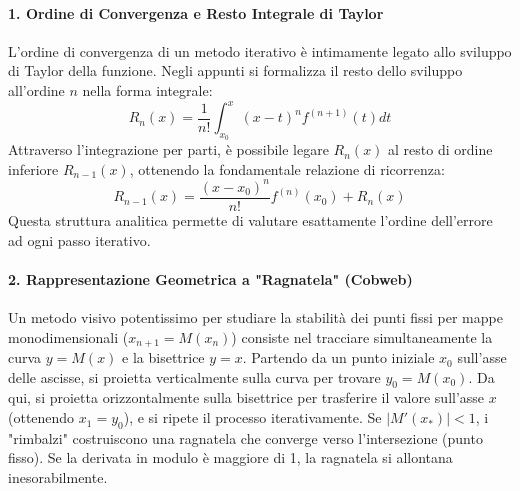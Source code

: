 \documentclass[12pt,a4paper]{article}
\begin{document}
\paragraph{1. Ordine di Convergenza e Resto Integrale di Taylor}
L'ordine di convergenza di un metodo iterativo è intimamente legato allo sviluppo di Taylor della funzione. Negli appunti si formalizza il resto dello sviluppo all'ordine $n$ nella forma integrale:
\begin{equation}
R_n(x) = \frac{1}{n!} \int_{x_0}^x (x-t)^n f^{(n+1)}(t) dt
\end{equation}
Attraverso l'integrazione per parti, è possibile legare $R_n(x)$ al resto di ordine inferiore $R_{n-1}(x)$, ottenendo la fondamentale relazione di ricorrenza:
\begin{equation}
R_{n-1}(x) = \frac{(x-x_0)^n}{n!} f^{(n)}(x_0) + R_n(x)
\end{equation}
Questa struttura analitica permette di valutare esattamente l'ordine dell'errore ad ogni passo iterativo.

\paragraph{2. Rappresentazione Geometrica a "Ragnatela" (Cobweb)}
Un metodo visivo potentissimo per studiare la stabilità dei punti fissi per mappe monodimensionali ($x_{n+1} = M(x_n)$) consiste nel tracciare simultaneamente la curva $y = M(x)$ e la bisettrice $y = x$.
Partendo da un punto iniziale $x_0$ sull'asse delle ascisse, si proietta verticalmente sulla curva per trovare $y_0 = M(x_0)$. Da qui, si proietta orizzontalmente sulla bisettrice per trasferire il valore sull'asse $x$ (ottenendo $x_1 = y_0$), e si ripete il processo iterativamente.
Se $|M'(x_*)| < 1$, i "rimbalzi" costruiscono una ragnatela che converge verso l'intersezione (punto fisso). Se la derivata in modulo è maggiore di 1, la ragnatela si allontana inesorabilmente.
\end{document}
